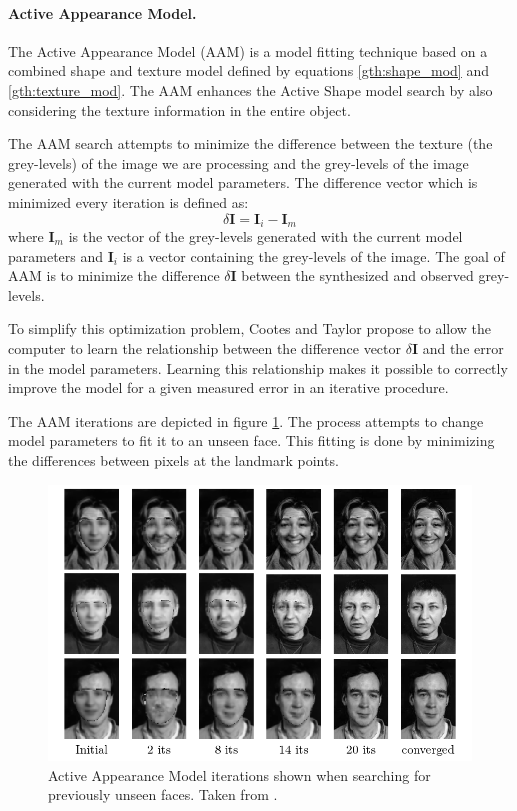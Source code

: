 \documentclass[11pt,a4paper,twoside]{report}
\begin{document}
\paragraph{Active Appearance Model.}
The Active Appearance Model (AAM) is a model fitting technique based on a
combined shape and texture model defined by equations \ref{gth:shape_mod} and \ref{gth:texture_mod}. The AAM enhances the Active Shape model search by also considering the texture
information in the entire object.

The AAM search attempts to minimize the difference between the texture (the
grey-levels) of the image we are processing and the grey-levels of the
image generated with the current model parameters. The difference vector which
 is minimized every iteration is defined as:
\begin{equation}
\delta \mathbf{I} = \mathbf{I}_i - \mathbf{I}_m
\end{equation}
where $\mathbf{I}_m$ is the vector of the grey-levels generated with the current model
parameters and $\mathbf{I}_i$ is a vector containing the grey-levels of the
image. The goal of AAM is to minimize the difference $\delta \mathbf{I}$ between
the synthesized and observed grey-levels.

To simplify this optimization problem, Cootes and Taylor propose to allow the
computer to learn the relationship
between the difference vector $\delta \mathbf{I}$ and the error in the model
parameters. Learning this relationship makes it possible to correctly improve the
model for a given measured error in an iterative procedure.

The AAM iterations are depicted in figure \ref{gr:amm}. The process attempts to
change model parameters to fit it to an unseen face. This fitting is done by
minimizing the differences between pixels at the landmark points.

\begin{figure}[H]

\includegraphics[scale=0.8]{images/amm_example.png}
\caption{ Active Appearance Model iterations shown when searching for previously
 unseen faces. Taken from \cite{activeApp04}. }
\label{gr:amm}
\end{figure}
\end{document}
